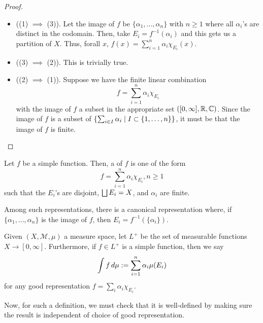 \documentclass[11pt,leqno,oneside]{amsbook}
\numberwithin{thm}{section}
\newcommand{\M}{\mathcal{M}} %
\begin{document}
 \begin{proof}
   \begin{itemize}
   \item ((1) $\implies$ (3)). Let the image of $f$ be $\{\alpha_1,
     \ldots, \alpha_n\}$ with $n \geq 1$ where all $\alpha_i$'s are
     distinct in the codomain. Then, take $E_i = f^{-1}(\alpha_i)$ and
     this gets us a partition of $X$. Thus, forall $x$, $f(x) =
     \sum_{i=1}^n \alpha_i \chi_{E_i}(x)$.
   \item ((3) $\implies$ (2)). This is trivially true.
   \item ((2) $\implies$ (1)). Suppose we have the finite linear
     combination \[
       f = \sum_{i=1}^n \alpha_i \chi_{E_i}
     \]
     with the image of $f$ a subset in the appropriate set
     $([0,\infty],{\mathbb R},{\mathbb C})$. Since the image of $f$ is a subset of
     $\{\sum_{i \in I} \alpha_i \mid I \subset \{1,\ldots,n\}\}$, it
     must be that the image of $f$ is finite.
   \end{itemize}
 \end{proof}
 \begin{defn}
   Let $f$ be a simple function. Then, a  of
   $f$ is one of the form \[
     f = \sum_{i=1}^n \alpha_i \chi_{E_i}, n \geq 1
   \]
   such that the $E_i$'s are disjoint, $\bigsqcup E_i = X$, and
   $\alpha_i$ are finite.
 \end{defn}
Among such representations, there is a canonical representation where,
if $\{\alpha_1, \ldots, \alpha_n\}$ is the image of $f$, then $E_i =
f^{-1}(\{\alpha_i\})$.
\begin{defn}
  Given $(X, \M, \mu)$ a measure space, let $L^+$ be the set of
  measurable functions $X \to [0,\infty]$. Furthermore, if $f \in L^+$
  is a simple function, then we say \[
    \int f \, d\mu := \sum_{i=1}^n \alpha_i \mu(E_i)
  \]
  for any good representation $f = \sum_i \alpha_i \chi_{E_i}$.
\end{defn}
Now, for such a definition, we must check that it is well-defined by
making sure the result is independent of choice of good
representation.
\end{document}
